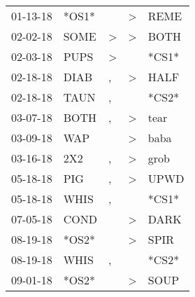 \begin{supertabular}{p{0.07\textwidth}p{0.06\textwidth}p{0.02\textwidth}p{0.02\textwidth}p{0.06\textwidth}}
          01-13-18\textsuperscript{} &                            *OS1* &                  &     \textgreater &           REME\textsuperscript{} \\
          02-02-18\textsuperscript{} &           SOME\textsuperscript{} &     \textgreater &     \textgreater &           BOTH\textsuperscript{} \\
          02-03-18\textsuperscript{} &           PUPS\textsuperscript{} &     \textgreater &                  &                            *CS1* \\
          02-18-18\textsuperscript{} &           DIAB\textsuperscript{} &                , &     \textgreater &           HALF\textsuperscript{} \\
          02-18-18\textsuperscript{} &           TAUN\textsuperscript{} &                , &                  &                            *CS2* \\
          03-07-18\textsuperscript{} &           BOTH\textsuperscript{} &                , &     \textgreater &           tear\textsuperscript{} \\
          03-09-18\textsuperscript{} &            WAP\textsuperscript{} &                  &     \textgreater &           baba\textsuperscript{} \\
          03-16-18\textsuperscript{} &            2X2\textsuperscript{} &                , &     \textgreater &           grob\textsuperscript{} \\
          05-18-18\textsuperscript{} &            PIG\textsuperscript{} &                , &     \textgreater &           UPWD\textsuperscript{} \\
          05-18-18\textsuperscript{} &           WHIS\textsuperscript{} &                , &                  &                            *CS1* \\
          07-05-18\textsuperscript{} &           COND\textsuperscript{} &                  &     \textgreater &           DARK\textsuperscript{} \\
          08-19-18\textsuperscript{} &                            *OS2* &                  &     \textgreater &           SPIR\textsuperscript{} \\
          08-19-18\textsuperscript{} &           WHIS\textsuperscript{} &                , &                  &                            *CS2* \\
          09-01-18\textsuperscript{} &                            *OS2* &                  &     \textgreater &           SOUP\textsuperscript{} \\

\end{supertabular}
